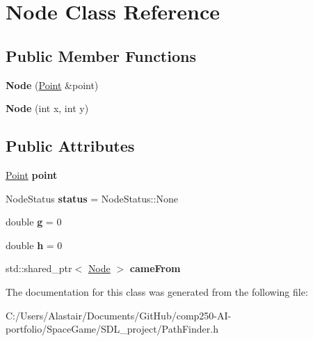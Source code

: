 \hypertarget{class_node}{}\section{Node Class Reference}
\label{class_node}
\subsection*{Public Member Functions}
\begin{DoxyCompactItemize}
\item 
\mbox{\label{class_node_aa87c87fa68b0386513671f234c9ad06f}} 
{\bfseries Node} (\hyperlink{class_point}{Point} \&point)
\item 
\mbox{\label{class_node_a23a19f53dfbb18fec58cdac90de3d144}} 
{\bfseries Node} (int x, int y)
\end{DoxyCompactItemize}
\subsection*{Public Attributes}
\begin{DoxyCompactItemize}
\item 
\mbox{\label{class_node_a86ddd28e833c1132e29a35b734673094}} 
\hyperlink{class_point}{Point} {\bfseries point}
\item 
\mbox{\label{class_node_a95314c432adbee13bcac6876597b21a7}} 
Node\+Status {\bfseries status} = Node\+Status\+::\+None
\item 
\mbox{\label{class_node_af93b606cf10abfe1766617ad9de59b01}} 
double {\bfseries g} = 0
\item 
\mbox{\label{class_node_ae96fc081027353fbe793c35ea511116b}} 
double {\bfseries h} = 0
\item 
\mbox{\label{class_node_a41265f70ebb5a82514e68902efe44aee}} 
std\+::shared\+\_\+ptr$<$ \hyperlink{class_node}{Node} $>$ {\bfseries came\+From}
\end{DoxyCompactItemize}


The documentation for this class was generated from the following file\+:\begin{DoxyCompactItemize}
\item 
C\+:/\+Users/\+Alastair/\+Documents/\+Git\+Hub/comp250-\/\+A\+I-\/portfolio/\+Space\+Game/\+S\+D\+L\+\_\+project/Path\+Finder.\+h\end{DoxyCompactItemize}
